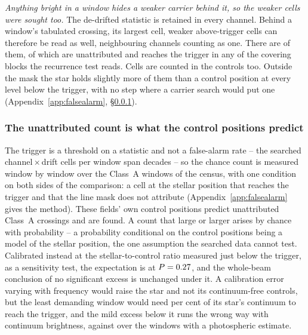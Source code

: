 \emph{Anything bright in a window hides a weaker carrier behind it, so the
weaker cells were sought too.} The de-drifted statistic is retained in every
channel. Behind a window's tabulated crossing, its largest cell, weaker
above-trigger cells can therefore be read as well, neighbouring channels
counting as one. There are \CkNSecondaryWord{} of them, of which \CkNSecUnattrWord{} are
unattributed and \CkNRecurWord{} reaches the trigger in any of the covering
blocks the recurrence test reads. Cells are counted in the controls too.
Outside the mask the star holds slightly more of them than a control position
at every level below the trigger, with no step where a carrier search would put
one (Appendix~\ref{app:falsealarm}, \S\ref{sec:trigunif}).

\subsubsection{The unattributed count is what the control positions predict}
\label{sec:trigunif}

The trigger is a threshold on a statistic and not a false-alarm rate -- the
searched channel\,$\times$\,drift cells per window span \TuCellsDecades{}
decades -- so the chance count is measured window by window over the \CeNWin{}
Class~A windows of the census, with one condition on both sides of the
comparison: a cell at the stellar position that reaches the trigger and that
the line mask does not attribute (Appendix~\ref{app:falsealarm} gives the
method). These fields' own control positions predict \CeExp{} unattributed
Class~A crossings and \CeObs{} are found. A count that large or larger arises
by chance with probability \CeProbNull{} -- a probability conditional on the
control positions being a model of the stellar position, the one assumption
the searched data cannot test. Calibrated instead at the stellar-to-control
ratio \CeNear{} measured just below the trigger, as a sensitivity test, the
expectation is \CeExpNear{} at $P=0.27$, and the whole-beam conclusion
of no significant excess is unchanged under it. A calibration error varying
with frequency would raise the star and not its continuum-free controls, but
the least demanding window would need \CyEpsMinPct{} per cent of its star's
continuum to reach the trigger, and the mild excess below it runs the wrong way
with continuum brightness, \CkRatioContBright{} against \CkRatioContFaint{} over
the \CkNContWin{} windows with a photospheric estimate.

